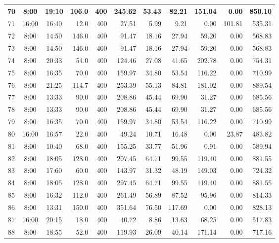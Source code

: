 \begin{landscape}
\begin{longtable}{|c|c|c|r|r|r|r|r|r|r|r|}
\hline
70 & 8:00 & 19:10 & 106.0 & 400 & 245.62 & 53.43 & 82.21 & 151.04 & 0.00 & 850.10 \\
\hline
\rowcolor{gray!8}
71 & 16:00 & 16:40 & 12.0 & 400 & 27.51 & 5.99 & 9.21 & 0.00 & 101.81 & 535.31 \\
\hline
72 & 8:00 & 14:50 & 146.0 & 400 & 91.47 & 18.16 & 27.94 & 59.20 & 0.00 & 568.83 \\
\hline
\rowcolor{gray!8}
73 & 8:00 & 14:50 & 146.0 & 400 & 91.47 & 18.16 & 27.94 & 59.20 & 0.00 & 568.83 \\
\hline
74 & 8:00 & 20:33 & 54.0 & 400 & 124.46 & 27.08 & 41.65 & 202.78 & 0.00 & 754.31 \\
\hline
\rowcolor{gray!8}
75 & 8:00 & 16:35 & 70.0 & 400 & 159.97 & 34.80 & 53.54 & 116.22 & 0.00 & 710.99 \\
\hline
76 & 8:00 & 21:25 & 114.7 & 400 & 253.39 & 55.13 & 84.81 & 181.02 & 0.00 & 889.54 \\
\hline
\rowcolor{gray!8}
77 & 8:00 & 13:33 & 90.0 & 400 & 208.86 & 45.44 & 69.90 & 31.27 & 0.00 & 685.56 \\
\hline
78 & 8:00 & 13:33 & 90.0 & 400 & 208.86 & 45.44 & 69.90 & 31.27 & 0.00 & 685.56 \\
\hline
\rowcolor{gray!8}
79 & 8:00 & 16:35 & 70.0 & 400 & 159.97 & 34.80 & 53.54 & 116.22 & 0.00 & 710.99 \\
\hline
80 & 16:00 & 16:57 & 22.0 & 400 & 49.24 & 10.71 & 16.48 & 0.00 & 23.87 & 483.82 \\
\hline
\rowcolor{gray!8}
81 & 8:00 & 10:40 & 68.0 & 400 & 155.25 & 33.77 & 51.96 & 0.91 & 0.00 & 589.94 \\
\hline
82 & 8:00 & 18:05 & 128.0 & 400 & 297.45 & 64.71 & 99.55 & 119.40 & 0.00 & 881.55 \\
\hline
\rowcolor{gray!8}
83 & 8:00 & 17:60 & 60.0 & 400 & 143.97 & 31.32 & 48.19 & 149.03 & 0.00 & 724.32 \\
\hline
84 & 8:00 & 18:05 & 128.0 & 400 & 297.45 & 64.71 & 99.55 & 119.40 & 0.00 & 881.55 \\
\hline
\rowcolor{gray!8}
85 & 8:00 & 16:32 & 112.0 & 400 & 261.49 & 56.89 & 87.52 & 95.96 & 0.00 & 814.33 \\
\hline
86 & 8:00 & 13:31 & 150.0 & 400 & 351.64 & 76.50 & 117.69 & 0.00 & 0.00 & 828.13 \\
\hline
\rowcolor{gray!8}
87 & 16:00 & 20:15 & 18.0 & 400 & 40.72 & 8.86 & 13.63 & 68.25 & 0.00 & 517.83 \\
\hline
88 & 8:00 & 18:55 & 52.0 & 400 & 119.93 & 26.09 & 40.14 & 171.14 & 0.00 & 717.16 \\

\end{longtable}
\end{landscape}
